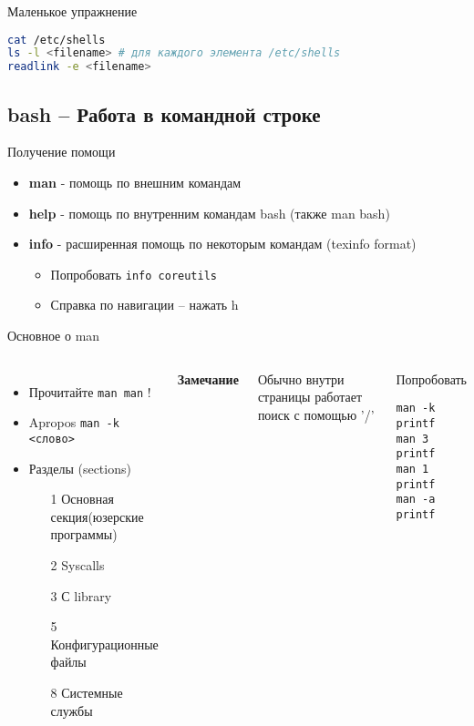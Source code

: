 \documentclass[ignorenonframetext, professionalfonts, hyperref={pdftex, unicode}]{beamer}
\begin{document}
\begin{frame}[fragile]{Маленькое упражнение}
\begin{lstlisting}[language=bash]
cat /etc/shells
ls -l <filename> # для каждого элемента /etc/shells
readlink -e <filename> 
\end{lstlisting}
\end{frame}
\subsection{bash -- Работа в командной строке}
\begin{frame}[fragile]{Получение помощи}
  \begin{itemize}
    \pause
    \item \textbf{man} - помощь по внешним командам
    \pause
    \item \textbf{help} - помощь по внутренним командам bash (также man bash)
    \pause
    \item \textbf{info} - расширенная помощь по некоторым командам (texinfo format)
      \begin{itemize}
       \item   Попробовать {\tt info coreutils}
       \item   Справка по навигации -- нажать h
      \end{itemize}
  \end{itemize}
\end{frame}
\begin{frame}[fragile]{Основное о man}
\begin{columns}
  \column{2.2in}
  \begin{itemize}
        \item Прочитайте {\tt man man} !
        \item Apropos {\tt man -k <слово>}
        \item Разделы (sections)
          \begin{itemize}
            \item[1] Основная секция(юзерские программы) 
            \item[2] Syscalls
            \item[3] С library
            \item[5] Конфигурационные файлы
            \item[8] Системные службы
          \end{itemize}
  \end{itemize}
  \textbf{Замечание}

  Обычно внутри страницы работает поиск с помощью '/'
 \pause 
 \column{1in}
 \begin{block}{Попробовать}
\begin{lstlisting}
man -k printf
man 3 printf
man 1 printf
man -a printf
\end{lstlisting}
\end{block}
\end{columns}
\end{frame}
\end{document}

